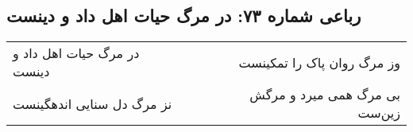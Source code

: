 \begin{center}
\section*{رباعی شماره ۷۳: در مرگ حیات اهل داد و دینست}
\label{sec:sh073}
\begin{longtable}{l p{0.5cm} r}
در مرگ حیات اهل داد و دینست
&&
وز مرگ روان پاک را تمکینست
\\
نز مرگ دل سنایی اندهگینست
&&
بی مرگ همی میرد و مرگش زین‌ست
\\
\end{longtable}
\end{center}
